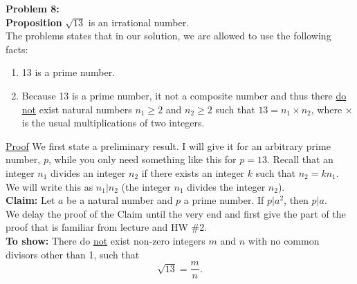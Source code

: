 \documentclass[letterpaper]{article}
\begin{document}
\newpage

\noindent \textbf{Problem 8:} \\

\noindent \textbf{Proposition} $\sqrt{13}$ is an irrational number.\\

The problems states that in our solution, we are allowed to use the following facts:
\begin{enumerate}
\setlength{\itemsep}{.15in}
\renewcommand{\labelenumi}{(\alph{enumi})}
\setlength{\itemsep}{.1in}
\item 13 is a prime number.
\item Because 13 is a prime number, it not a composite number and thus there \underline{do not} exist natural numbers $n_1\ge 2$ and $n_2\ge 2$ such that $13 = n_1 \times n_2$, where $\times$ is the usual multiplications of two integers.
\end{enumerate}

\noindent \underline{Proof} We first state a preliminary result. I will give it for an arbitrary prime number, $p$, while you only need something like this for $p=13$. Recall that an integer $n_1$ divides an integer $n_2$ if there exists an integer $k$ such that $n_2 = k n_1$. We will write this as $n_1|n_2$ (the integer $n_1$ divides the integer $n_2$).\\

\noindent \textbf{Claim:} Let $a$ be a natural number and $p$ a prime number. If $p|a^2$, then $p|a$. \\

We delay the proof of the Claim until the very end and first give the part of the proof that is familiar from lecture and HW \#2. \\

\noindent \textbf{To show:} There do \underline{not} exist non-zero integers $m$ and $n$ with no common divisors other than 1, such that
$$\sqrt{13}=\frac{m}{n}.$$\\
\end{document}
